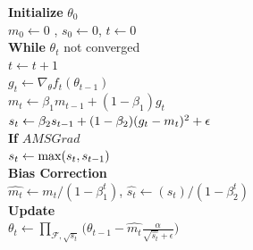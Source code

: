 \documentclass{article}
\begin{document}
\begin{algorithm}{}
\textbf{Initialize} $\theta_0$ \\
\hspace{16mm} $m_0 \leftarrow 0$ , $s_0 \leftarrow 0$, $t \leftarrow 0$ \\
\textbf{While} $\theta_t$ not converged \\
\hspace{16mm} $t \leftarrow t + 1 $ \\
\hspace{16mm} $g_t \leftarrow \nabla_{\theta}f_t(\theta_{t-1})$ \\
\hspace{16mm} $m_t \leftarrow \beta_1 m_{t-1} + (1 - \beta_1) g_t$ \\
\hspace{16mm} $s_t \leftarrow \beta_2 s_{t-1} + (1 - \beta_2) {\color{black}(g_t - m_t)^2} + \epsilon$ \\
\hspace{16mm} \textbf{If} $AMSGrad$ \\
\hspace{24mm} ${\color{black}{s_t \leftarrow \operatorname{max}(s_t, s_{t-1})}}$ \\
\hspace{16mm} \textbf{Bias Correction} \\
\hspace{24mm} $\widehat{m_t} \leftarrow m_t /( 1 - \beta_1^t)$, \hspace{8mm} $\widehat{s_t} \leftarrow (s_t )/ ( 1 - \beta_2 ^t)$ \\
\hspace{16mm} \textbf{Update} \\
\hspace{24mm} $\theta_t \leftarrow \prod_{\mathcal{F},\sqrt{s_t}} \Big( \theta_{t-1} - \widehat{m_t} \frac{\alpha}{ \sqrt{\widehat{s_t}} +\epsilon} \Big)$
\caption{\textbf{AdaBelief}}
\label{supalgo:amsbelief}
\end{algorithm}

\FloatBarrier
\end{document}
